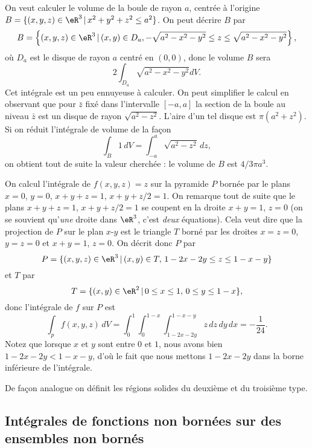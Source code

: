 \begin{example}
On veut calculer le volume de la boule de rayon $a$, centrée à l'origine $B=\{(x,y,z)\in\eR^3\,\vert\, x^2+y^2+z^2\leq a^2 \}$. On peut décrire $B$ par
\[
  B=\left\{(x,y,z)\in\eR^3\,\vert\, (x,y)\in D_a, -\sqrt{a^2-x^2-y^2}\leq z\leq \sqrt{a^2-x^2-y^2}  \right\},
\]
où $D_a$ est le disque de rayon $a$ centré en $(0,0)$, donc le volume $B$ sera
\[
2 \int_{D_a}\sqrt{a^2-x^2-y^2} dV.
\] 
Cet intégrale est un peu ennuyeuse à calculer. On peut simplifier le calcul en observant que pour $\bar z$ fixé dans l'intervalle $[-a,a]$ la section de la boule au niveau $\bar z$ est un disque de rayon $\sqrt{a^2-z^2}$. L'aire d'un tel disque est  $\pi (a^2+z^2)$. Si on réduit l'intégrale de volume de la façon
\[
\int_{B} 1\, dV=\int_{-a}^{a}  \sqrt{a^2-z^2}\, dz,
\] 
on obtient tout de suite la valeur cherchée : le volume de $B$ est $4/3 \pi a^3$.   
\end{example}
\begin{example}
	On calcul l'intégrale de $f(x,y,z)=z$ sur la pyramide $P$ bornée par le plans $x=0$, $y=0$, $x+y+z=1$, $x+y+z/2=1$. On remarque tout de suite que le plans $x+y+z=1$, $x+y+z/2=1$ se coupent en la droite $x+y=1$, $z=0$ (on se souvient qu'\emph{une} droite dans $\eR^3$, c'est \emph{deux} équations). Cela veut dire que la projection de $P$ sur le plan $x$-$y$ est le  triangle $T$ borné par les droites $x=z=0$, $y=z=0$ et $x+y=1$, $z=0$.  
On  décrit donc $P$ par
\[
P=\{(x,y,z)\in\eR^3\,\vert\, (x,y)\in T, \, 1-2x-2y\leq z\leq 1-x-y\}
\] 
et $T$ par 
\[
T=\{(x,y)\in\eR^2\,\vert\, 0\leq x\leq 1,\,  0\leq y\leq 1-x\},
\]
donc l'intégrale de $f$ sur $P$ est 
\[
\int_pf(x,y,z)\, dV= \int_{0}^{1}\int_{0}^{1-x}\int_{1-2x-2y}^{1-x-y}z \,dz\,dy\,dx=-\frac{1}{ 24 }.
\]
Notez que lorsque $x$ et $y$ sont entre $0$ et $1$, nous avons bien $1-2x-2y<1-x-y$, d'où le fait que nous mettons $1-2x-2y$ dans la borne inférieure de l'intégrale.
\end{example}

De façon analogue on définit les régions solides du deuxième et du troisième type.  

					\subsection[Fonctions et ensembles non bornés]{Intégrales de fonctions non bornées sur des ensembles non bornés}

